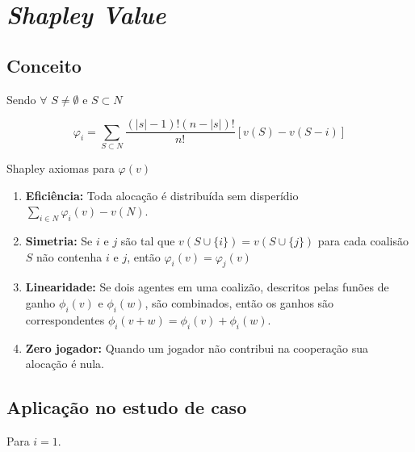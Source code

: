 \documentclass[
	article,			        %
	11pt,				          %
	oneside,			        %
	a4paper,			        %
	english,			        %
	brazil,				        %
	sumario=tradicional
]{abntex2}\usepackage[]{graphicx}\usepackage[]{color}
\begin{document}
\section{\emph{Shapley Value}}
\label{sec:teoria}

\subsection{Conceito}

Sendo $\forall$ $S \neq \emptyset$ e $S \subset N$

\begin{equation}
  \label{eq:shaVal}
  \varphi _{i} = \sum_{S \subset N} \frac{(|s| - 1)!(n - |s|)!}{n!}[v(S)-v(S - i)]
\end{equation}

Shapley axiomas para $\varphi(v)$
\begin{enumerate}
  \item \textbf{Eficiência:} Toda alocação é distribuída sem disperídio $\sum_{i \in N} \varphi_i(v) - v(N)$.
  \item \textbf{Simetria:} Se $i$ e $j$ são tal que $v(S \cup \{i\}) = v(S \cup \{j\})$ para cada coalisão $S$ não contenha $i$ e $j$, então $\varphi_i (v) = \varphi_j (v)$
  \item \textbf{Linearidade:} Se dois agentes em uma coalizão, descritos pelas funões de ganho $\phi_i(v)$ e $\phi_i(w)$, são combinados, então os ganhos são correspondentes $\phi_i(v + w) = \phi_i(v) + \phi_i(w)$.
  \item \textbf{Zero jogador:} Quando um jogador não contribui na cooperação sua alocação é nula.
\end{enumerate}

\subsection{Aplicação no estudo de caso}

Para $i = 1$.
\end{document}
